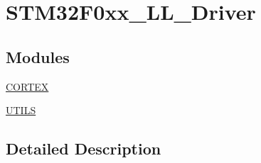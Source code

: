 \hypertarget{group___s_t_m32_f0xx___l_l___driver}{}\section{S\+T\+M32\+F0xx\+\_\+\+L\+L\+\_\+\+Driver}
\label{group___s_t_m32_f0xx___l_l___driver}
\subsection*{Modules}
\begin{DoxyCompactItemize}
\item 
\hyperlink{group___c_o_r_t_e_x___l_l}{C\+O\+R\+T\+EX}
\item 
\hyperlink{group___u_t_i_l_s___l_l}{U\+T\+I\+LS}
\end{DoxyCompactItemize}


\subsection{Detailed Description}
